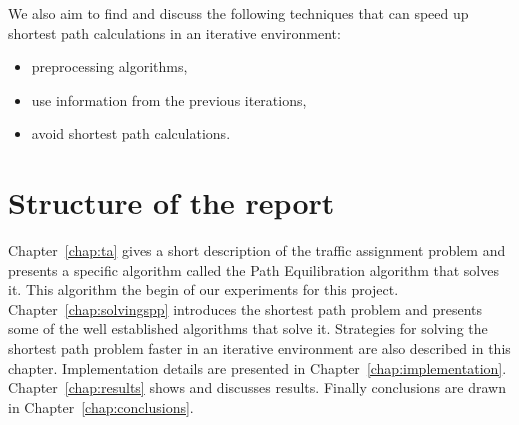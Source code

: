 We also aim to find and discuss the following techniques that can speed up shortest path calculations in an iterative environment:
\begin{itemize}
    \item preprocessing algorithms,
    \item use information from the previous iterations,
    \item avoid shortest path calculations.
\end{itemize}

\section{Structure of the report}
Chapter~\ref{chap:ta} gives a short description of the traffic assignment problem
and presents a specific algorithm called the Path Equilibration algorithm that solves it.
This algorithm the begin of our experiments for this project.
Chapter~\ref{chap:solvingspp} introduces the shortest path problem and presents some of the well established algorithms that solve it.
Strategies for solving the shortest path problem faster in an iterative environment are also described in this chapter.
Implementation details are presented in Chapter~\ref{chap:implementation}.
Chapter~\ref{chap:results} shows and discusses results.
Finally conclusions are drawn in Chapter~\ref{chap:conclusions}.
